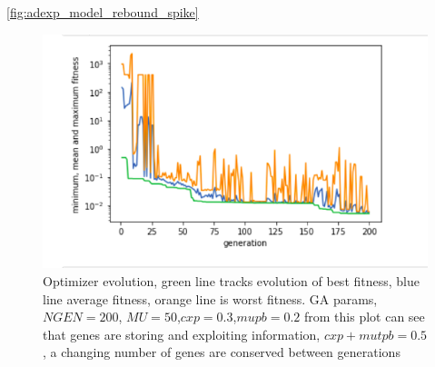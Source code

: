 \ref{fig:adexp_model_rebound_spike}

\begin{figure}
    \centering
    \includegraphics[scale=0.7]{figures/optimizer_internal_validation}
    \caption[Optimizer error over generations]{Optimizer evolution, green line tracks evolution of best fitness, blue line average fitness, orange line is worst fitness. GA params, $NGEN=200$, $MU=50$,$cxp=0.3$,$mupb=0.2$ from this plot can see that genes are storing and exploiting information, $cxp+mutpb=0.5$, a changing number of genes are conserved between generations }
    \label{fig:my_label}
\end{figure}


